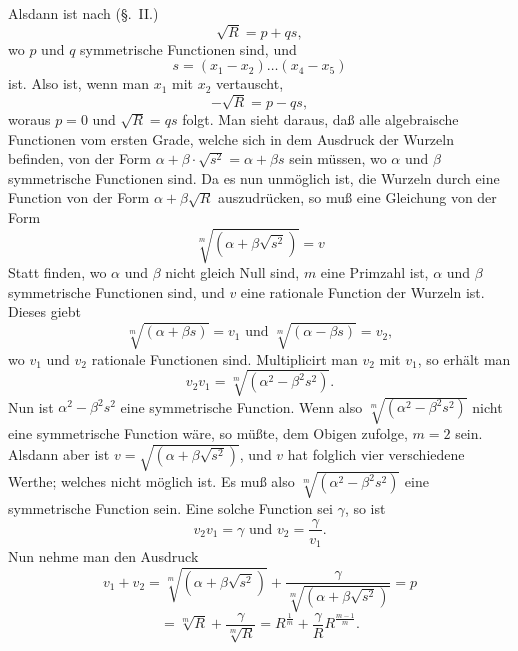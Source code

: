 \documentclass{article}
\begin{document}
Alsdann ist nach (§.~II.)
\[ \sqrt{R} = p + qs, \]
wo $p$ und $q$ symmetrische Functionen sind, und
\[ s = (x_1 - x_2) \ldots (x_4 - x_5) \]
ist. Also ist, wenn man $x_1$ mit $x_2$ vertauscht,
\[ -\sqrt{R} = p - qs, \]
woraus $p = 0$ und $\sqrt{R} = qs$ folgt. Man sieht daraus, daß alle algebraische Functionen vom ersten Grade, welche sich in dem Ausdruck der Wurzeln befinden, von der Form $\alpha + \beta \cdot \sqrt{s^{2}} = \alpha + \beta s$ sein müssen, wo $\alpha$ und $\beta$ symmetrische Functionen sind. Da es nun unmöglich ist, die Wurzeln durch eine Function von der Form $\alpha + \beta \sqrt{R}$ auszudrücken, so muß eine Gleichung von der Form
\[ \sqrt[m]{(\alpha + \beta \sqrt{s^{2}})} = v \]
Statt finden, wo $\alpha$ und $\beta$ nicht gleich Null sind, $m$ eine Primzahl ist, $\alpha$ und $\beta$ symmetrische Functionen sind, und $v$ eine rationale Function der Wurzeln ist. Dieses giebt
\[ \sqrt[m]{(\alpha + \beta s)} = v_1 \text{ und } \sqrt[m]{(\alpha - \beta s)} = v_2, \]
wo $v_1$ und $v_2$ rationale Functionen sind. Multiplicirt man $v_2$ mit $v_1$, so erhält man
\[ v_2 v_1 = \sqrt[m]{(\alpha^{2} - \beta^{2} s^{2})}. \]
Nun ist $\alpha^{2} - \beta^{2} s^{2}$ eine symmetrische Function. Wenn also $\sqrt[m]{(\alpha^{2} - \beta^{2} s^{2})}$ nicht eine symmetrische Function wäre, so müßte, dem Obigen zufolge, $m = 2$ sein. Alsdann aber ist $v = \sqrt{(\alpha + \beta \sqrt{s^{2}})}$, und $v$ hat folglich vier verschiedene Werthe; welches nicht möglich ist. Es muß also $\sqrt[m]{(\alpha^{2} - \beta^{2} s^{2})}$ eine symmetrische Function sein. Eine solche Function sei $\gamma$, so ist
\[ v_2 v_1 = \gamma \text{ und } v_2 = \frac{\gamma}{v_1}. \]
Nun nehme man den Ausdruck
\[ v_1 + v_2 = \sqrt[m]{(\alpha + \beta \sqrt{s^{2}})} + \frac{\gamma}{\sqrt[m]{(\alpha + \beta \sqrt{s^{2}})}} = p \]
\[ = \sqrt[m]{R} + \frac{\gamma}{\sqrt[m]{R}} = R^{\frac{1}{m}} + \frac{\gamma}{R} R^{\frac{m-1}{m}}. \]
\end{document}
